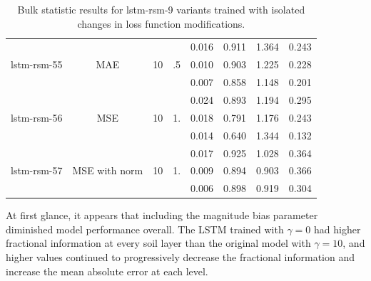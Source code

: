 \begin{table}[h!p]
\begin{tabular}{c|c|c|c|c|c|c|c }
\hline
\multirow{3}{6em}{lstm-rsm-55} & \multirow{3}{3em}{MAE} & \multirow{3}{3em}{10} &  \multirow{3}{3em}{.5} & 0.016 & 0.911 & 1.364 & 0.243 \\ & & & & 0.010 & 0.903 & 1.225 & 0.228 \\ & & & & 0.007 & 0.858 & 1.148 & 0.201 \\
\hline
\hline
\multirow{3}{6em}{lstm-rsm-56} & \multirow{3}{3em}{MSE} & \multirow{3}{3em}{10} &  \multirow{3}{3em}{1.} & 0.024 & 0.893 & 1.194 & 0.295 \\ & & & & 0.018 & 0.791 & 1.176 & 0.243 \\ & & & & 0.014 & 0.640 & 1.344 & 0.132 \\
\hline
\hline
\multirow{3}{6em}{lstm-rsm-57} & \multirow{3}{3em}{MSE with norm} & \multirow{3}{3em}{10} &  \multirow{3}{3em}{1.} & 0.017 & 0.925 & 1.028 & 0.364 \\ & & & & 0.009 & 0.894 & 0.903 & 0.366 \\ & & & & 0.006 & 0.898 & 0.919 & 0.304 \\
\end{tabular}
    \caption{Bulk statistic results for lstm-rsm-9 variants trained with isolated changes in loss function modifications.}
    \label{loss-variants-table}
\end{table}

At first glance, it appears that including the magnitude bias parameter diminished model performance overall. The LSTM trained with $\gamma=0$ had higher fractional information at every soil layer than the original model with $\gamma=10$, and higher values continued to progressively decrease the fractional information and increase the mean absolute error at each level.

